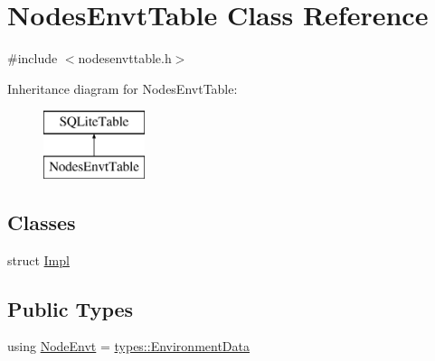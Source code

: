 \hypertarget{class_nodes_envt_table}{}\section{Nodes\+Envt\+Table Class Reference}
\label{class_nodes_envt_table}


{\ttfamily \#include $<$nodesenvttable.\+h$>$}

Inheritance diagram for Nodes\+Envt\+Table\+:\begin{figure}[H]
\begin{center}
\leavevmode
\includegraphics[height=2.000000cm]{d2/d00/class_nodes_envt_table}
\end{center}
\end{figure}
\subsection*{Classes}
\begin{DoxyCompactItemize}
\item 
struct \mbox{\hyperlink{struct_nodes_envt_table_1_1_impl}{Impl}}
\end{DoxyCompactItemize}
\subsection*{Public Types}
\begin{DoxyCompactItemize}
\item 
using \mbox{\hyperlink{class_nodes_envt_table_adbc6a037efe1edee85eab03779c0b151}{Node\+Envt}} = \mbox{\hyperlink{structtypes_1_1_environment_data}{types\+::\+Environment\+Data}}
\end{DoxyCompactItemize}
